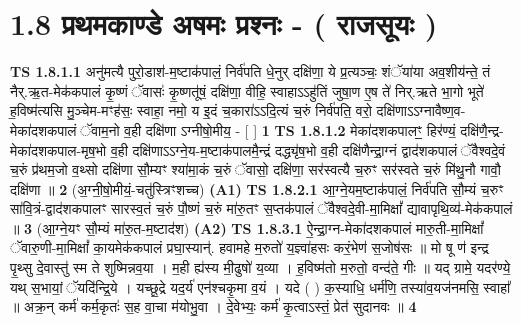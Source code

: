 \documentclass[17pt]{extarticle}
\begin{document}
     \section*{ 1.8     प्रथमकाण्डे अषमः प्रश्नः - ( राजसूयः ) }
                                        \textbf{ TS 1.8.1.1} \newline
                  अनु॑मत्यै पुरो॒डाश॑-म॒ष्टाक॑पालं॒ निर्व॑पति धे॒नुर् दक्षि॑णा॒ ये प्र॒त्यञ्चः॒ शंॅया॑या अव॒शीय॑न्ते॒ तं नैर्.ऋ॒त-मेक॑कपालं कृ॒ष्णं ॅवासः॑ कृ॒ष्णतू॑षं॒ दक्षि॑णा॒ वीहि॒ स्वाहाऽऽहु॑तिं जुषा॒ण ए॒ष ते॑ निर्.ऋते भा॒गो भूते॑ ह॒विष्म॑त्यसि मु॒ञ्चेम-मꣳह॑सः॒ स्वाहा॒ नमो॒ य इ॒दं च॒कारा॑ऽऽदि॒त्यं च॒रुं निर्व॑पति॒ वरो॒ दक्षि॑णाऽऽग्नावैष्ण॒व-मेका॑दशकपालं ॅवाम॒नो व॒ही दक्षि॑णा ऽग्नीषो॒मीय॒ - [ ] \textbf{  1} \newline
                  \newline
                                \textbf{ TS 1.8.1.2} \newline
                  मेका॑दशकपालꣳ॒॒ हिर॑ण्यं॒ दक्षि॑णै॒न्द्र-मेका॑दशकपाल-मृष॒भो व॒ही दक्षि॑णाऽऽग्ने॒य-म॒ष्टाक॑पालमै॒न्द्रं दद्ध्यृ॑ष॒भो व॒ही दक्षि॑णैन्द्रा॒ग्नं द्वाद॑शकपालं ॅवैश्वदे॒वं च॒रुं प्र॑थम॒जो व॒थ्सो दक्षि॑णा सौ॒म्यꣳ श्या॑मा॒कं च॒रुं ॅवासो॒ दक्षि॑णा॒ सर॑स्वत्यै च॒रुꣳ सर॑स्वते च॒रुं मि॑थु॒नौ गावौ॒ दक्षि॑णा ॥ \textbf{  2} \newline
                  \newline
                      (अ॒ग्नी॒षो॒मीयं॒-चतु॑स्त्रिꣳशच्च)  \textbf{(A1)} \newline \newline
                                        \textbf{ TS 1.8.2.1} \newline
                  आ॒ग्ने॒यम॒ष्टाक॑पालं॒ निर्व॑पति सौ॒म्यं च॒रुꣳ सा॑वि॒त्रं-द्वाद॑शकपालꣳ सारस्व॒तं च॒रुं पौ॒ष्णं च॒रुं मा॑रु॒तꣳ स॒प्तक॑पालं ॅवैश्वदे॒वी-मा॒मिक्षां᳚ द्यावापृथि॒व्य॑-मेक॑कपालं ॥ \textbf{  3} \newline
                  \newline
                      (आ॒ग्ने॒यꣳ सौ॒म्यं मा॑रु॒त-म॒ष्टाद॑श)  \textbf{(A2)} \newline \newline
                                        \textbf{ TS 1.8.3.1} \newline
                  ऐ॒न्द्रा॒ग्न-मेका॑दशकपालं मारु॒ती-मा॒मिक्षां᳚ ॅवारु॒णी-मा॒मिक्षां᳚ का॒यमेक॑कपालं प्रघा॒स्यान्॑. हवामहे म॒रुतो॑ य॒ज्ञ्वा॑हसः करं॒भेण॑ स॒जोष॑सः ॥ मो षू ण॑ इन्द्र पृ॒थ्सु दे॒वास्तु॑ स्म ते शुष्मिन्नव॒या । म॒ही ह्य॑स्य मी॒ढुषो॑ य॒व्या । ह॒विष्म॑तो म॒रुतो॒ वन्द॑ते॒ गीः ॥ यद् ग्रामे॒ यदर॑ण्ये॒ यथ् स॒भायां॒ ॅयदि॑न्द्रि॒ये । यच्छू॒द्रे यद॒र्य॑ एन॑श्चकृ॒मा व॒यं । यदे ( ) क॒स्याधि॒ धर्म॑णि॒ तस्या॑व॒यज॑नमसि॒ स्वाहा᳚ ॥ अक्र॒न् कर्म॑ कर्म॒कृतः॑ स॒ह वा॒चा म॑योभु॒वा । दे॒वेभ्यः॒ कर्म॑ कृ॒त्वाऽस्तं॒ प्रेत॑ सुदानवः ॥ \textbf{  4 } \newline
\end{document}
